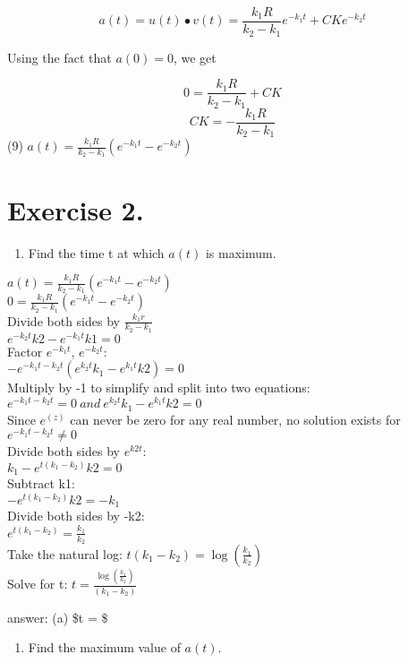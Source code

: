 \documentclass[]{article}
\providecommand{\tightlist}{%
  \setlength{\itemsep}{0pt}\setlength{\parskip}{0pt}}
\begin{document}
\[a(t) = u(t) \bullet v(t) = \frac{k_1R}{k_2-k_1}e^{-k_1t} + CKe^{-k_2t}\]

Using the fact that \(a(0) = 0\), we get

\[0 = \frac{k_1R}{k_2-k_1} + CK\] \[CK = -\frac{k_1R}{k_2-k_1}\] (9)
\(a(t) = \frac{k_1R}{k_2-k_1}(e^{-k_1t} - e^{-k_2t})\)

\section{Exercise 2.}\label{exercise-2.}

\begin{enumerate}
\def\labelenumi{(\alph{enumi})}
\tightlist
\item
  Find the time t at which \(a(t)\) is maximum.
\end{enumerate}

\(a(t) = \frac{k_1 R}{k_2 - k_1}(e^{-k_1 t}-e^{-k_2 t})\)\\
\(0 = \frac{k_1 R}{k_2 - k_1}(e^{-k_1 t}-e^{-k_2 t})\)\\
Divide both sides by \(\frac{k_1 r}{k_2 - k_1}\)\\
\(e^{-k_2 t}k2 - e^{-k_1 t}k1 = 0\)\\
Factor \(e^{-k_1 t}\), \(e^{-k_2 t}\):\\
\(-e^{-k_1 t - k_2 t}(e^{k_2 t}k_1 - e^{k_1 t}k2) = 0\)\\
Multiply by -1 to simplify and split into two equations:\\
\(e^{-k_1 t - k_2 t} = 0 ~and~e^{k_2 t}k_1 - e^{k_1 t}k2= 0\)\\
Since \(e^(z)\) can never be zero for any real number, no solution
exists for \(e^{-k_1 t - k_2 t} \neq 0\)\\
Divide both sides by \(e^{k2 t}\):\\
\(k_1 - e^{t (k_1 - k_2)}k2= 0\)\\
Subtract k1:\\
\(- e^{t (k_1 - k_2)}k2= -k_1\)\\
Divide both sides by -k2:\\
\(e^{t (k_1 - k_2)}= \frac{k_1}{k_2}\)\\
Take the natural log: \(t (k_1 - k_2)= \log{(\frac{k_1}{k_2})}\)\\
Solve for t: \(t = \frac{\log{(\frac{k_1}{k_2})}}{(k_1 - k_2)}\)

answer: (a) \$t = \$

\newpage

\begin{enumerate}
\def\labelenumi{(\alph{enumi})}
\setcounter{enumi}{1}
\tightlist
\item
  Find the maximum value of \(a(t)\).
\end{enumerate}
\end{document}
